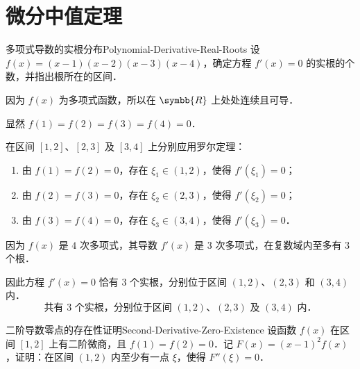 \section{微分中值定理}

\begin{problem}{多项式导数的实根分布}{Polynomial-Derivative-Real-Roots}
    设 $f(x) = (x-1)(x-2)(x-3)(x-4)$，确定方程 $f'(x) = 0$ 的实根的个数，并指出根所在的区间．
\end{problem}

\begin{solution}
    因为 $f(x)$ 为多项式函数，所以在 $\symbb{R}$ 上处处连续且可导．

    显然 $f(1) = f(2) = f(3) = f(4) = 0$．

    在区间 $[1, 2]$、$[2, 3]$ 及 $[3, 4]$ 上分别应用罗尔定理：
    \begin{enumerate}
        \item 由 $f(1) = f(2) = 0$，存在 $\xi_1 \in (1, 2)$，使得 $f'(\xi_1) = 0$；
        \item 由 $f(2) = f(3) = 0$，存在 $\xi_2 \in (2, 3)$，使得 $f'(\xi_2) = 0$；
        \item 由 $f(3) = f(4) = 0$，存在 $\xi_3 \in (3, 4)$，使得 $f'(\xi_3) = 0$．
    \end{enumerate}
    因为 $f(x)$ 是 $4$ 次多项式，其导数 $f'(x)$ 是 $3$ 次多项式，在复数域内至多有 $3$ 个根．

    因此方程 $f'(x) = 0$ 恰有 $3$ 个实根，分别位于区间 $(1, 2)$、$(2, 3)$ 和 $(3, 4)$ 内．
    \begin{equation}
        \boxed{\text{共有 } 3 \text{ 个实根，分别位于区间 } (1, 2)\text{、}(2, 3) \text{ 及 } (3, 4) \text{ 内．}}
    \end{equation}
\end{solution}

\begin{problem}{二阶导数零点的存在性证明}{Second-Derivative-Zero-Existence}
    设函数 $f(x)$ 在区间 $[1, 2]$ 上有二阶微商，且 $f(1) = f(2) = 0$．记 $F(x) = (x-1)^2 f(x)$，证明：在区间 $(1, 2)$ 内至少有一点 $\xi$，使得 $F''(\xi) = 0$．
\end{problem}

